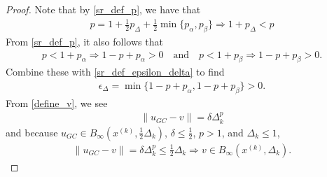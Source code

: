 \documentclass{article}
\theoremstyle{case}
\numberwithin{theorem}{subsection}
\newcommand{\dk}{\Delta_k}
\newcommand{\huk}{{{\hat u}^{(k)}}}
\newcommand{\tr}{{ B_{\infty}\left(\xk, \dk\right) }}
\newcommand{\xk}{{x^{(k)}}}
\begin{document}
\begin{proof}
Note that by \cref{sr_def_p}, we have that
\begin{align}
p = 1 + \frac 1 2 p_{\Delta} + \frac 1 2 \min\{p_{\alpha}, p_{\beta} \} \Longrightarrow 1 + p_{\Delta} < p \label{sr_p_big}
\end{align}
From \cref{sr_def_p}, it also follows that
\begin{align}
p < 1 + p_{\alpha} \Longrightarrow 1 - p + p_{\alpha} > 0   \quad \textrm{and} \quad
p < 1 + p_{\beta}\Longrightarrow 1 - p + p_{\beta} > 0. \label{sr_p_small_alpha_beta}
\end{align}
Combine these with \cref{sr_def_epsilon_delta} to find
\begin{align}
\epsilon_{\Delta} = \min\{1 - p + p_{\alpha}, 1 - p + p_{\beta} \} > 0 \label{sr_epsilon_delta_positive}.
\end{align}
From \cref{define_v}, we see
\begin{align}
\|u_{GC} - v\| = \delta \dk^{p} \label{sr_v_close_u}
\end{align}
and because $u_{GC} \in B_{\infty}(\xk, \frac 1 2 \dk)$, $\delta \le \frac 1 2 $, $p > 1$, and $\dk \le 1$,
\begin{align*}
\|u_{GC} - v\| = \delta \dk^{p} \le \frac 1 2\dk \Longrightarrow v \in \tr.
\end{align*}



\end{proof}
\end{document}
